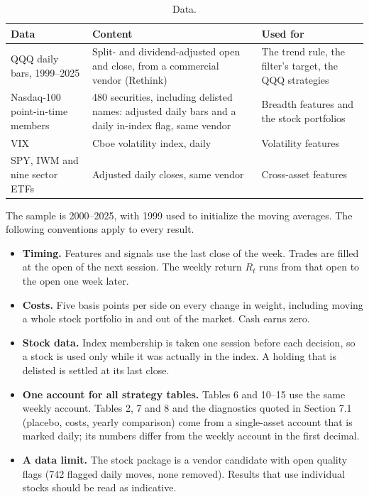 \documentclass[11pt]{article}
\providecommand{\tightlist}{\setlength{\itemsep}{2pt}\setlength{\parskip}{0pt}}
\begin{document}
\begin{table}[H]
\centering\small
\caption{Data.}
\label{tab:data}
\begin{tabularx}{\textwidth}{@{}p{}Xp{}@{}}
\toprule
Data & Content & Used for \\
\midrule
QQQ daily bars, 1999--2025 & Split- and dividend-adjusted open and close, from a commercial vendor (Rethink) & The trend rule, the filter's target, the QQQ strategies \\
\addlinespace
Nasdaq-100 point-in-time members & 480 securities, including delisted names: adjusted daily bars and a daily in-index flag, same vendor & Breadth features and the stock portfolios \\
\addlinespace
VIX & Cboe volatility index, daily & Volatility features \\
\addlinespace
SPY, IWM and nine sector ETFs & Adjusted daily closes, same vendor & Cross-asset features \\
\bottomrule
\end{tabularx}
\end{table}

The sample is 2000--2025, with 1999 used to initialize the moving averages. The following conventions apply to every result.

\begin{itemize}
\tightlist
\item
  \textbf{Timing.} Features and signals use the last close of the week. Trades are filled at the open of the next session. The weekly return \(R_t\) runs from that open to the open one week later.
\item
  \textbf{Costs.} Five basis points per side on every change in weight, including moving a whole stock portfolio in and out of the market. Cash earns zero.
\item
  \textbf{Stock data.} Index membership is taken one session before each decision, so a stock is used only while it was actually in the index. A holding that is delisted is settled at its last close.
\item
  \textbf{One account for all strategy tables.} Tables 6 and 10--15 use the same weekly account. Tables 2, 7 and 8 and the diagnostics quoted in Section 7.1 (placebo, costs, yearly comparison) come from a single-asset account that is marked daily; its numbers differ from the weekly account in the first decimal.
\item
  \textbf{A data limit.} The stock package is a vendor candidate with open quality flags (742 flagged daily moves, none removed). Results that use individual stocks should be read as indicative.
\end{itemize}
\end{document}
